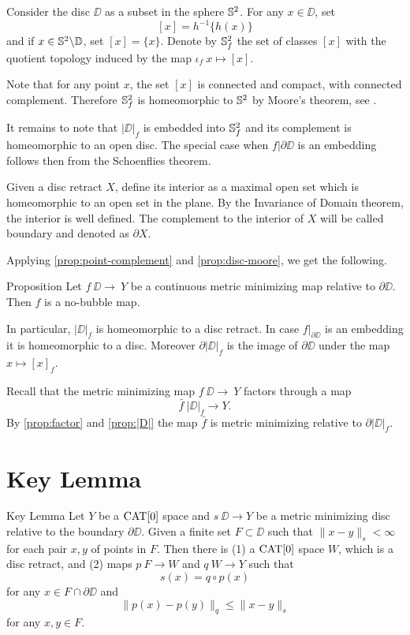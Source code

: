 \documentclass[a4paper,10pt]{amsart}
\begin{document}
Consider the disc $\DD$ as a subset in the sphere $\mathbb{S}^2$.
For any $x\in \DD$, set 
\[[x]=h^{-1}\{h(x)\}\]
and
if $x\in \mathbb{S}^2\backslash \mathbb{D}$, set $[x]=\{x\}$.
Denote by $\mathbb{S}^2_f$ the set of classes $[x]$ with the quotient topology induced by the map $\iota_f\:x\mapsto [x]$.

Note that for any point $x$, the set $[x]$ is connected and compact, with connected complement.
Therefore $\mathbb{S}^2_f$ is homeomorphic to $\mathbb{S}^2$ by Moore's theorem, see \cite{moore}.

It remains to note that $|\DD|_f$ is embedded into $\mathbb{S}^2_f$ and its complement is homeomorphic to an open disc.
The special case when $f|{\partial\DD}$ is an embedding follows then from the Schoenflies theorem.
\qeds

Given a disc retract $X$,
define its interior as a maximal open set which is homeomorphic to an open set in the plane.
By the Invariance of Domain theorem, the interior is well defined.
The complement to the interior of $X$ will be called boundary and denoted as $\partial X$.

Applying \ref{prop:point-complement} and \ref{prop:disc-moore}, we get the following.

\begin{thm}{Proposition}\label{prop:|D|}
Let $f\:\DD\to\ Y$ be a continuous metric minimizing map relative to $\partial \DD$.
Then $f$ is a no-bubble map.

In particular,  $|\DD|_f$ is homeomorphic to a disc retract. In case $f|_{\partial\DD}$ is an
embedding it is homeomorphic to a disc.
Moreover $\partial|\DD|_f$ is the image of $\partial \DD$
under the map $x\mapsto [x]_f$.
\end{thm}

Recall that the metric minimizing map $f\:\DD\to\ Y$ factors through a map \[\bar f\:|\DD|_f\to Y.\]
By \ref{prop:factor} and \ref{prop:|D|} 
the map $\bar f$
is metric minimizing relative to $\partial|\DD|_f$.











\section{Key Lemma}


\begin{thm}{Key Lemma}\label{lem:key}
Let $Y$ be a $\mathop{\rm CAT}\nolimits[0]$ space and $s\:\DD\to Y$ 
be a metric minimizing disc relative to the boundary $\partial \DD$.
Given a finite set $F\subset \DD$ such that $\|x-y\|_s<\infty$ for each pair $x,y$ of points in $F$. Then
there is 
(1) a $\mathop{\rm CAT}\nolimits[0]$ space $W$, which is a disc retract,
and (2) maps $p\:F\to W$ and $q\:W\to Y$ such that
\[s(x)=q\circ p(x)\] 
for any $x\in F\cap \partial \DD$
and 
\[\|p(x)-p(y)\|_q\le \|x-y\|_s\] 
for any $x,y\in F$.
\end{thm}
\end{document}
